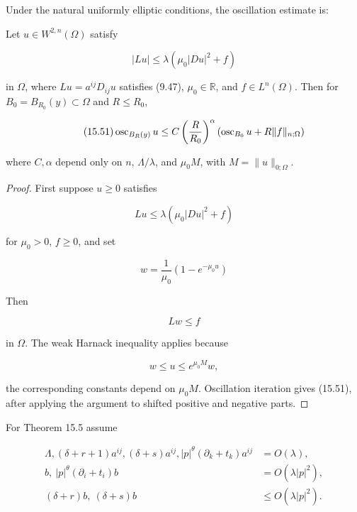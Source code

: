 Under the natural uniformly elliptic conditions, the oscillation estimate is:

\begin{lemma}\label{gilbarg-trudinger.lem.15.4.oscillation-quadratic-growth}
Let \(u\in W^{2,n}(\Omega)\) satisfy

\begin{equation}
\tag{15.50}
|Lu| \leq \lambda(\mu_0|Du|^2 + f)
\end{equation}

in $\Omega$, where $Lu=a^{ij}D_{ij}u$ satisfies (9.47), $\mu_0\in\mathbb R$, and
$f\in L^n(\Omega)$. Then for $B_0=B_{R_0}(y)\subset\Omega$ and $R\leq R_0$,

\begin{equation}
\tag{15.51}
\operatorname{osc}_{B_R(y)} u \leq C\left(\frac{R}{R_0}\right)^\alpha \left(\operatorname{osc}_{B_0}u + R\|f\|_{n;\Omega}\right)
\end{equation}

where $C,\alpha$ depend only on $n$, $\Lambda/\lambda$, and $\mu_0M$, with
$M=\|u\|_{0;\Omega}$.
\end{lemma}

\begin{proof}
\sketch First suppose $u\geq0$ satisfies

\begin{equation}
\tag{15.52}
Lu \leq \lambda(\mu_0|Du|^2 + f)
\end{equation}

for \(\mu_0>0\), \(f\ge0\), and set

\[
w = \frac{1}{\mu_0}\left(1 - e^{-\mu_0 u}\right)
\]



Then

\[
Lw \leq f
\]

in \(\Omega\). The weak Harnack inequality applies because

\[
w \leq u \leq e^{\mu_0 M}w,
\]

the corresponding constants depend on \(\mu_0M\). Oscillation iteration gives
(15.51), after applying the argument to shifted positive and negative parts.
\end{proof}

For Theorem 15.5 assume

\begin{equation}\tag{15.53}
\begin{aligned}
\Lambda,(\delta+r+1)a^{ij},(\delta+s)a^{ij},
 |p|^\theta(\partial_k+t_k)a^{ij}&=O(\lambda),\\
b,\ |p|^\theta(\partial_i+t_i)b&=O(\lambda|p|^2),\\
(\delta+r)b,\ (\delta+s)b&\leq O(\lambda|p|^2).
\end{aligned}
\end{equation}

